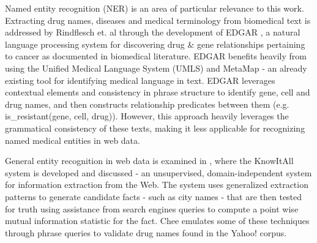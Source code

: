 \documentclass[twoside,11pt]{article}
\begin{document}
Named entity recognition (NER) is an area of particular relevance to this work. Extracting drug names, diseases and medical terminology from biomedical text
is addressed by Rindflesch et. al through the development of EDGAR \citep{Rindflesch}, a natural language processing system for discovering drug & gene relationships pertaining to cancer as documented in biomedical literature. EDGAR benefits heavily from using the Unified Medical Language System (UMLS) and MetaMap \citep{Metamap} - an already existing tool for identifying medical language in text. EDGAR leverages contextual elements and consistency in phrase structure to identify gene, cell and drug names, and then constructs relationship predicates between them (e.g. is\_resistant(gene, cell, drug)). However, this approach heavily leverages the grammatical consistency of these texts, making it less applicable for recognizing named medical entities in web data.

General entity recognition in web data is examined in \citet{Etzioni}, where the KnowItAll system is developed and discussed - an unsupervised, domain-independent system for information extraction from the Web. The system uses generalized extraction patterns to generate candidate facts - such as city names - that are then tested for truth using assistance from search engines queries to compute a point wise mutual information statistic for the fact. Chee emulates some of these techniques through phrase queries to validate drug names found in the Yahoo! corpus.
\end{document}

